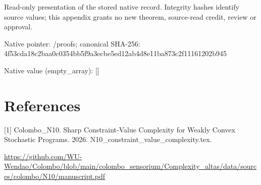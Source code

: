 \documentclass[10pt,a4paper]{article}
\begin{document}
Read-only presentation of the stored native record. Integrity hashes identify source values; this appendix grants no new theorem, source-read credit, review or approval.



Native pointer: /proofs; canonical SHA-256: 4f53cda18c2baa0c0354bb5f\allowbreak{}9a3ecbe5ed12ab4d8e11ba87\allowbreak{}3c2f11161202b945



Native value (empty\_array): []



\section{References}


[1] Colombo\_N10. Sharp Constraint-Value Complexity for Weakly Convex Stochastic Programs. 2026. N10\_constraint\_value\_complexity.tex.



\url{https://github.com/WU-Wendao/Colombo/blob/main/colombo_sensorium/Complexity_altas/data/sources/colombo/N10/manuscript.pdf}
\end{document}
